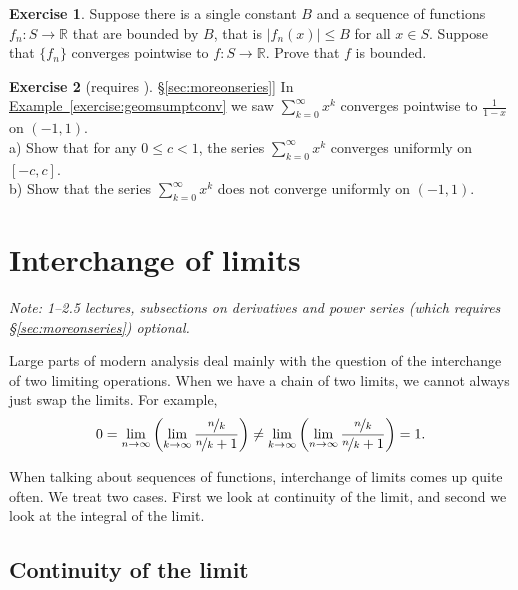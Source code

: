 \documentclass[12pt]{book}
\newcommand{\abs}[1]{\left\lvert {#1} \right\rvert}
\newcommand{\R}{{\mathbb{R}}}
\newcommand{\sectionnotes}[1]{\noindent \emph{Note: #1} \medskip \par}
\newcommand{\sectionnewpage}{\clearpage}
\theoremstyle{plain}
\theoremstyle{remark}
\theoremstyle{definition}
\theoremstyle{exercise}
\newtheorem{exercise}{Exercise}[section]
\theoremstyle{example}
\newcommand{\sectionref}[1]{\hyperref[#1]{\S\ref*{#1}}}
\newcommand{\exampleref}[1]{\hyperref[#1]{Example~\ref*{#1}}}
\begin{document}
\begin{exercise}
Suppose there is a single constant $B$ and
a sequence of functions
$f_n \colon S \to \R$ that are bounded by $B$,
that is $\abs{f_n(x)} \leq B$ for all $x \in S$.
Suppose that $\{ f_n \}$ converges pointwise
to $f \colon S \to \R$.
Prove that $f$ is bounded.
\end{exercise}

\begin{exercise}[requires \sectionref{sec:moreonseries}]
In \exampleref{exercise:geomsumptconv} we saw
$\sum_{k=0}^\infty x^k$ converges pointwise to $\frac{1}{1-x}$ on
$(-1,1)$.\\
a) Show that for any $0 \leq c < 1$, the series
$\sum_{k=0}^\infty x^k$ converges uniformly on $[-c,c]$.
\\
b) Show that the series $\sum_{k=0}^\infty x^k$ does not converge uniformly
on $(-1,1)$.
\end{exercise}


\sectionnewpage
\section{Interchange of limits}
\label{sec:liminter}

\sectionnotes{1--2.5 lectures,
subsections on derivatives and power series (which
requires \sectionref{sec:moreonseries}) optional.}

Large parts of modern analysis deal mainly with the question of the
interchange of two limiting operations.  When
we have a chain of two limits, we cannot always just swap the limits.
For example,
\begin{equation*}
0 = 
\lim_{n\to\infty}
\left(
\lim_{k\to\infty}
\frac{\nicefrac{n}{k}}{\nicefrac{n}{k} + 1}
\right)
\not=
\lim_{k\to\infty}
\left(
\lim_{n\to\infty}
\frac{\nicefrac{n}{k}}{\nicefrac{n}{k} + 1}
\right)
= 1 .
\end{equation*}

When talking about sequences of functions, interchange of limits comes up
quite often.  We treat two cases.  First we look at continuity of
the limit, and second we look at the integral of the limit.

\subsection{Continuity of the limit}
\end{document}
